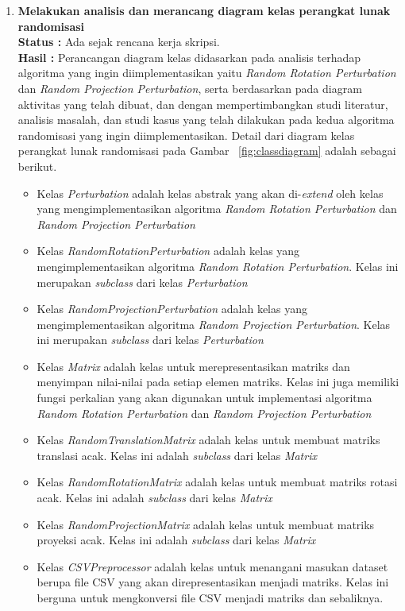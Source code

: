 \documentclass[a4paper,twoside]{article}
\begin{document}
\begin{enumerate}
		\item \textbf{Melakukan analisis dan merancang diagram kelas perangkat lunak randomisasi}\\
		{\bf Status :} Ada sejak rencana kerja skripsi.\\
		{\bf Hasil :} Perancangan diagram kelas didasarkan pada analisis terhadap algoritma yang ingin diimplementasikan yaitu \textit{Random Rotation Perturbation} dan \textit{Random Projection Perturbation}, serta berdasarkan pada diagram aktivitas yang telah dibuat, dan dengan mempertimbangkan studi literatur, analisis masalah, dan studi kasus yang telah dilakukan pada kedua algoritma randomisasi yang ingin diimplementasikan. Detail dari diagram kelas perangkat lunak randomisasi pada Gambar ~\ref{fig:classdiagram} adalah sebagai berikut.
		\begin{itemize}
			\item Kelas \textit{Perturbation} adalah kelas abstrak yang akan di-\textit{extend} oleh kelas yang mengimplementasikan algoritma \textit{Random Rotation Perturbation} dan \textit{Random Projection Perturbation}
			\item Kelas \textit{RandomRotationPerturbation} adalah kelas yang mengimplementasikan algoritma \textit{Random Rotation Perturbation}. Kelas ini merupakan \textit{subclass} dari kelas \textit{Perturbation}
			\item Kelas \textit{RandomProjectionPerturbation} adalah kelas yang mengimplementasikan algoritma \textit{Random Projection Perturbation}. Kelas ini merupakan \textit{subclass} dari kelas \textit{Perturbation}
			\item Kelas \textit{Matrix} adalah kelas untuk merepresentasikan matriks dan menyimpan nilai-nilai pada setiap elemen matriks. Kelas ini juga memiliki fungsi perkalian yang akan digunakan untuk implementasi algoritma \textit{Random Rotation Perturbation} dan \textit{Random Projection Perturbation}
			\item Kelas \textit{RandomTranslationMatrix} adalah kelas untuk membuat matriks translasi acak. Kelas ini adalah \textit{subclass} dari kelas \textit{Matrix}
			\item Kelas \textit{RandomRotationMatrix} adalah kelas untuk membuat matriks rotasi acak. Kelas ini adalah \textit{subclass} dari kelas \textit{Matrix}
			\item Kelas \textit{RandomProjectionMatrix} adalah kelas untuk membuat matriks proyeksi acak. Kelas ini adalah \textit{subclass} dari kelas \textit{Matrix}
			\item Kelas \textit{CSVPreprocessor} adalah kelas untuk menangani masukan dataset berupa file CSV yang akan direpresentasikan menjadi matriks. Kelas ini berguna untuk mengkonversi file CSV menjadi matriks dan sebaliknya.
		\end{itemize}
		

\end{enumerate}
\end{document}
